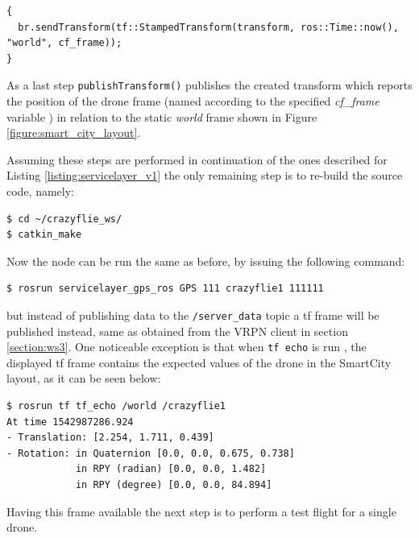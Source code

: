 \begin{verbatim}
{
  br.sendTransform(tf::StampedTransform(transform, ros::Time::now(), "world", cf_frame));
}
\end{verbatim}

\noindent As a last step \texttt{publishTransform()} publishes the created transform which reports the position of the drone frame (named according to the specified \textit{cf\_frame} variable ) in relation to the static \textit{world} frame shown in Figure \ref{figure:smart_city_layout}.

\noindent Assuming these steps are performed in continuation of the ones described for Listing \ref{listing:servicelayer_v1} the only remaining step is to re-build the source code, namely:
\begin{mdframed}[backgroundcolor=light-gray, linecolor=light-gray]
\begin{verbatim}
$ cd ~/crazyflie_ws/
$ catkin_make
\end{verbatim}
\end{mdframed}

\noindent Now the node can be run the same as before, by issuing the following command:
\begin{mdframed}[backgroundcolor=light-gray, linecolor=light-gray]
\begin{verbatim}
$ rosrun servicelayer_gps_ros GPS 111 crazyflie1 111111
\end{verbatim}
\end{mdframed}
\noindent but instead of publishing data to the \texttt{/server\_data} topic a tf frame will be published instead, same as obtained from the VRPN client in section \ref{section:ws3}. One noticeable exception is that when \texttt{tf echo} is run , the displayed tf frame contains the expected values of the drone in the SmartCity layout, as it can be seen below:

\begin{mdframed}[backgroundcolor=light-gray, linecolor=light-gray]
\begin{verbatim}
$ rosrun tf tf_echo /world /crazyflie1
At time 1542987286.924
- Translation: [2.254, 1.711, 0.439]
- Rotation: in Quaternion [0.0, 0.0, 0.675, 0.738]
            in RPY (radian) [0.0, 0.0, 1.482]
            in RPY (degree) [0.0, 0.0, 84.894]
\end{verbatim}
\end{mdframed}

\noindent Having this frame available the next step is to perform a test flight for a single drone.


